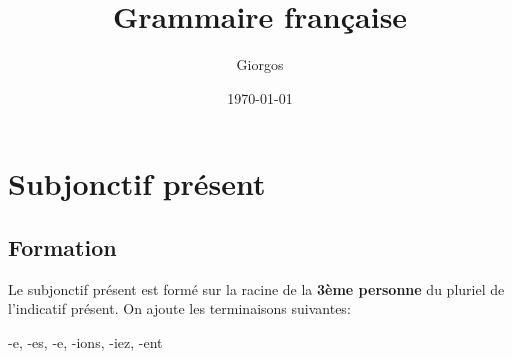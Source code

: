 \documentclass{report}
\title{Grammaire française}
\author{Giorgos}
\date{\today}
\begin{document}
\maketitle

\tableofcontents

\chapter{Subjonctif présent}
\section{Formation}
Le subjonctif présent est formé sur la racine de la \textbf{3ème personne} du pluriel de l'indicatif présent. On ajoute les terminaisons suivantes:
\begin{center}
    -e, -es, -e, -ions, -iez, -ent    
\end{center}
\end{document}
